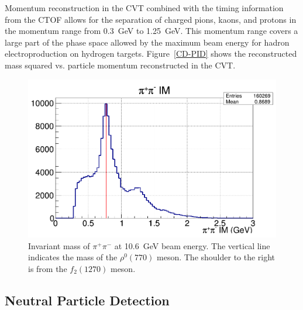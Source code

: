\documentclass[final,3p]{elsarticle}
\begin{document}
\begin{twocolumn}
Momentum reconstruction in the CVT combined with the timing information from the CTOF allows for the separation 
of charged pions, kaons, and protons in the momentum range from 0.3~GeV to 1.25~GeV. This momentum range covers
a large part of the phase space allowed by the maximum beam energy for hadron electroproduction on hydrogen targets.
Figure~\ref{CD-PID} shows the reconstructed mass squared vs. particle momentum reconstructed in the CVT.

\begin{figure}[t!]
\centerline{\includegraphics[width=1.0\columnwidth]{rhoMass.png}}
\caption{Invariant mass of $\pi^+\pi^-$ at 10.6~GeV beam energy. The vertical line indicates the mass of the
  $\rho^0(770)$ meson. The shoulder to the right is from the $f_2(1270)$ meson.}
\label{pip-pim-p}
\end{figure} 

\subsection{Neutral Particle Detection} 


\end{twocolumn}
\end{document}
